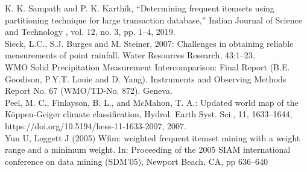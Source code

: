 \documentclass[10pt, conference, compsocconf]{IEEEtran}
\begin{document}
\begin{thebibliography}{1}

K. K. Sampath and P. K. Karthik, “Determining frequent itemsets using partitioning technique for large transaction database,” Indian Journal of Science and Technology , vol. 12, no. 3, pp. 1–4, 2019.\\

Sieck, L.C., S.J. Burges and M. Steiner, 2007: Challenges in obtaining reliable measurements of point rainfall. Water Resources Research, 43:1–23. \\

WMO Solid Precipitation Measurement Intercomparison: Final Report (B.E. Goodison, P.Y.T. Louie and D. Yang). Instruments and Observing Methods Report No. 67 (WMO/TD-No. 872). Geneva. \\

Peel, M. C., Finlayson, B. L., and McMahon, T. A.: Updated world map of the Köppen-Geiger climate classification, Hydrol. Earth Syst. Sci., 11, 1633–1644, https://doi.org/10.5194/hess-11-1633-2007, 2007.\\

Yun U, Leggett J (2005) Wfim: weighted frequent itemset mining with a weight range and a minimum weight. In: Proceeding of the 2005 SIAM international conference on data mining (SDM’05), Newport Beach, CA, pp 636–640

\end{thebibliography}




\end{document}
